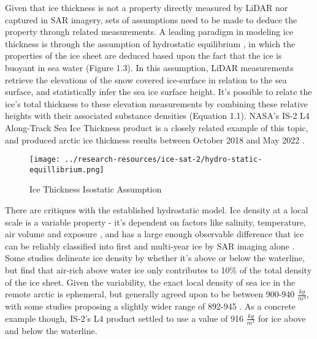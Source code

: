  \indent Given that ice thickness is not a property directly measured by LiDAR nor captured in SAR imagery, sets of assumptions need to be made to deduce the property through related measurements. A leading paradigm in modeling ice thickness is through the assumption of hydrostatic equilibrium \cite{ICESat-2-L4-Product} \cite{Hutchings_Heil_Lecomte_Stevens_Steer_Lieser_2015} \cite{Forsström_Gerland_Pedersen_2011}, in which the properties of the ice sheet are deduced based upon the fact that the ice is buoyant in sea water (Figure 1.3). In this assumption, LiDAR measurements retrieve the elevations of the snow covered ice-surface in relation to the sea surface, and statistically infer the sea ice surface height. It's possible to relate the ice's total thickness to these elevation measurements by combining these relative heights with their associated substance densities (Equation 1.1). NASA's IS-2 L4 Along-Track Sea Ice Thickness product is a closely related example of this topic, and produced arctic ice thickness results between October 2018 and May 2022 \cite{ICESat-2-L4-Product}.
 \begin{figure}[]
	\centering
	\texttt{[image: ../research-resources/ice-sat-2/hydro-static-equillibrium.png]}
	\caption{Ice Thickness Isostatic Assumption} \cite{ICESat-2-L4-Product}
	\label{fig:hydro-static-diagram}
\end{figure}

There are critiques with the established hydrostatic model. Ice density at a local scale is a variable property - it's dependent on factors like salinity, temperature, air volume and exposure \cite{sea-ice-properties}, and has a large enough observable difference that ice can be reliably classified into first and multi-year ice by SAR imaging alone \cite{SAR-U-Net}. Some studies delineate ice density by whether it's above or below the waterline, but find that air-rich above water ice only contributes to 10\% of the total density of the ice sheet. Given the variability, the exact local density of sea ice in the remote arctic is ephemeral, but generally agreed upon to be between 900-940 $\frac{kg}{m^3}$, with some studies proposing a slightly wider range of 892-945 \cite{sea-ice-properties}. As a concrete example though, IS-2's L4 product settled to use a value of 916 $\frac{kg}{m^3}$ for ice above and below the waterline.

